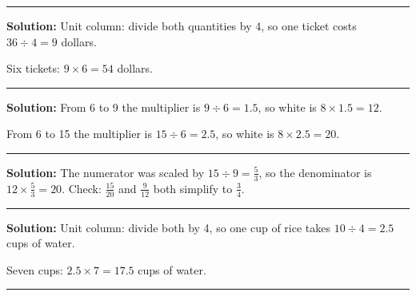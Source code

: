 \documentclass[12pt]{article}
\begin{document}
\vspace{0.3cm}\noindent\rule{\linewidth}{0.2pt}\vspace{0.3cm}


\textbf{Solution:} Unit column: divide both quantities by 4, so one ticket costs
$36 \div 4 = 9$ dollars. 

Six tickets: $9 \times 6 = 54$ dollars. 

\vspace{0.3cm}\noindent\rule{\linewidth}{0.2pt}\vspace{0.3cm}


\textbf{Solution:} From 6 to 9 the multiplier is $9 \div 6 = 1.5$, so white is
$8 \times 1.5 = 12$. 

From 6 to 15 the multiplier is $15 \div 6 = 2.5$, so white is $8 \times 2.5 =
20$. 

\vspace{0.3cm}\noindent\rule{\linewidth}{0.2pt}\vspace{0.3cm}


\textbf{Solution:} The numerator was scaled by $15 \div 9 = \frac{5}{3}$, so the
denominator is $12 \times \frac{5}{3} = 20$. Check: $\frac{15}{20}$ and
$\frac{9}{12}$ both simplify to $\frac{3}{4}$. 

\vspace{0.3cm}\noindent\rule{\linewidth}{0.2pt}\vspace{0.3cm}


\textbf{Solution:} Unit column: divide both by 4, so one cup of rice takes
$10 \div 4 = 2.5$ cups of water. 

Seven cups: $2.5 \times 7 = 17.5$ cups of water. 

\vspace{0.3cm}\noindent\rule{\linewidth}{0.2pt}\vspace{0.3cm}

\end{document}
